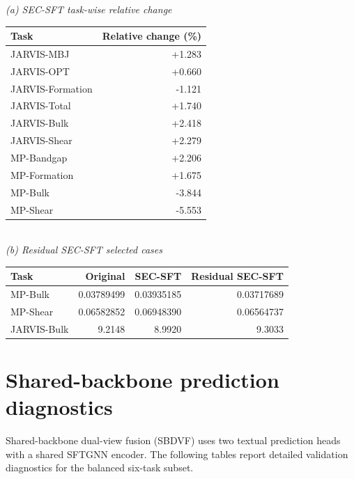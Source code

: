 \documentclass[a4paper,fleqn]{cas-sc}
\begin{document}
\begin{center}
\begin{minipage}{\linewidth}
\label{tab:message_detail}\centering\scriptsize
\textit{(a) SEC-SFT task-wise relative change}\\[-2pt]
\begin{tabular}{lr}\toprule
Task&Relative change (\%)\\\midrule
JARVIS-MBJ&+1.283\\
JARVIS-OPT&+0.660\\
JARVIS-Formation&-1.121\\
JARVIS-Total&+1.740\\
JARVIS-Bulk&+2.418\\
JARVIS-Shear&+2.279\\
MP-Bandgap&+2.206\\
MP-Formation&+1.675\\
MP-Bulk&-3.844\\
MP-Shear&-5.553\\\bottomrule
\end{tabular}
\\[6pt]
\textit{(b) Residual SEC-SFT selected cases}\\[-2pt]
\begin{tabular}{lrrr}\toprule
Task&Original&SEC-SFT&Residual SEC-SFT\\\midrule
MP-Bulk&0.03789499&0.03935185&0.03717689\\
MP-Shear&0.06582852&0.06948390&0.06564737\\
JARVIS-Bulk&9.2148&8.9920&9.3033\\\bottomrule
\end{tabular}
\end{minipage}
\end{center}

\FloatBarrier
\section{Shared-backbone prediction diagnostics}\label{app:shared}
Shared-backbone dual-view fusion (SBDVF) uses two textual prediction heads with a shared SFTGNN encoder. The following tables report detailed validation diagnostics for the balanced six-task subset.
\end{document}
